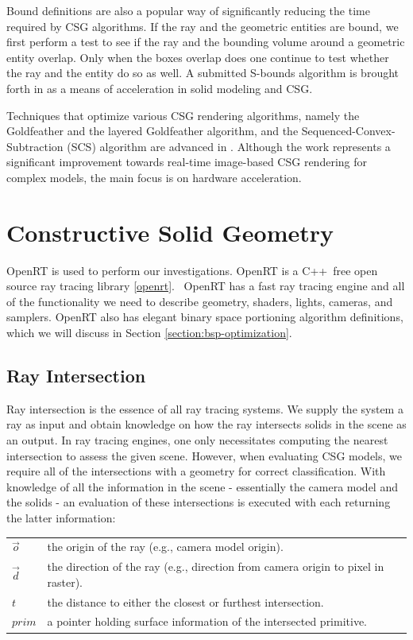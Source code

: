 \documentclass[a4paper,11pt,oneside]{article}
\makeatletter
\newenvironment{conditions}
  {\par\vspace{\abovedisplayskip}\noindent\begin{tabular}{>{$}l<{$} @{${}={}$} l}}
  {\end{tabular}\par\vspace{\belowdisplayskip}}
\makeatother
\begin{document}
Bound definitions are also a popular way of significantly reducing the time required by CSG algorithms. If the ray and the geometric entities are bound, we first perform a test to see if the ray and the bounding volume around a geometric entity overlap. Only when the boxes overlap does one continue to test whether the ray and the entity do so as well. A submitted S-bounds algorithm is brought forth in \cite{sbounds_csg} as a means of acceleration in solid modeling and CSG.
  
Techniques that optimize various CSG rendering algorithms, namely the Goldfeather and the layered Goldfeather algorithm, and the Sequenced-Convex- Subtraction (SCS) algorithm are advanced in \cite{hardware_accelerated_image_based_csg.}. Although the work represents a significant improvement towards real-time image-based CSG rendering for complex models,  the main focus is on hardware acceleration.
  

\section{Constructive Solid Geometry}
    
    OpenRT is used to perform our investigations. OpenRT is a C++ free open source ray tracing library \ref{openrt}.  OpenRT has a fast ray tracing engine and all of the functionality we need to describe geometry, shaders, lights, cameras, and samplers. OpenRT also has elegant binary space portioning algorithm definitions, which we will discuss in Section \ref{section:bsp-optimization}.
    
\subsection{Ray Intersection}
\label{section:ray-intersection}

Ray intersection is the essence of all ray tracing systems. We supply the system a ray as input and obtain knowledge on how the ray intersects solids in the scene as an output. In ray tracing engines, one only necessitates computing the nearest intersection to assess the given scene. However, when evaluating CSG models, we require all of the intersections with a geometry for correct classification. With knowledge of all the information in the scene - essentially the camera model and the solids - an evaluation of these intersections is executed with each returning the latter information:

\begin{conditions}
	\vec{o}     & the origin of the ray (e.g., camera model origin). \\
	\vec{d}     & the direction of the ray (e.g., direction from camera origin to pixel in raster). \\
	t     &  the distance to either the closest or furthest intersection. \\
	prim    &  a pointer holding surface information of the intersected primitive. 
\end{conditions}
\end{document}
